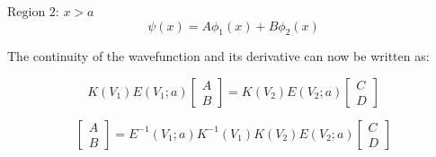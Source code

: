 \documentclass{article}
\begin{document}
$\text{Region 2: } x > a$
$$\psi(x) = A\phi_1(x) + B\phi_2(x)$$

The continuity of the wavefunction and its derivative can now be written as:

\[
K(V_1)E(V_1;a)
\begin{bmatrix}
A \\
B
\end{bmatrix}
= 
K(V_2)E(V_2;a)
\begin{bmatrix}
C \\
D
\end{bmatrix}
\]

\[
\begin{bmatrix}
A \\
B
\end{bmatrix}
= 
E^{-1}(V_1;a)K^{-1}(V_1)K(V_2)E(V_2;a)
\begin{bmatrix}
C \\
D
\end{bmatrix}
\]
\end{document}
